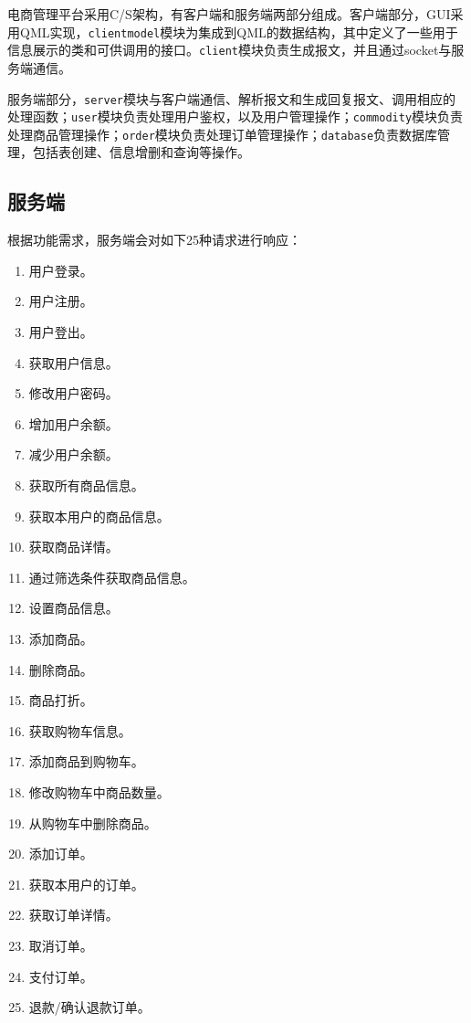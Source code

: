\documentclass[lang=cn,11pt,a4paper,cite=authornum]{paper}
\begin{document}
电商管理平台采用C/S架构，有客户端和服务端两部分组成。客户端部分，GUI采用QML实现，\texttt{clientmodel}模块为集成到QML的数据结构，其中定义了一些用于信息展示的类和可供调用的接口。\texttt{client}模块负责生成报文，并且通过socket与服务端通信。

服务端部分，\texttt{server}模块与客户端通信、解析报文和生成回复报文、调用相应的处理函数；\texttt{user}模块负责处理用户鉴权，以及用户管理操作；\texttt{commodity}模块负责处理商品管理操作；\texttt{order}模块负责处理订单管理操作；\texttt{database}负责数据库管理，包括表创建、信息增删和查询等操作。

\subsection{服务端}

根据功能需求，服务端会对如下25种请求进行响应：

\label{op}
\begin{enumerate}
    \item 用户登录。
    \item 用户注册。
    \item 用户登出。
    \item 获取用户信息。
    \item 修改用户密码。
    \item 增加用户余额。
    \item 减少用户余额。
    \item 获取所有商品信息。
    \item 获取本用户的商品信息。
    \item 获取商品详情。
    \item 通过筛选条件获取商品信息。
    \item 设置商品信息。
    \item 添加商品。
    \item 删除商品。
    \item 商品打折。
    \item 获取购物车信息。
    \item 添加商品到购物车。
    \item 修改购物车中商品数量。
    \item 从购物车中删除商品。
    \item 添加订单。
    \item 获取本用户的订单。
    \item 获取订单详情。
    \item 取消订单。
    \item 支付订单。
    \item 退款/确认退款订单。
\end{enumerate}
\end{document}
